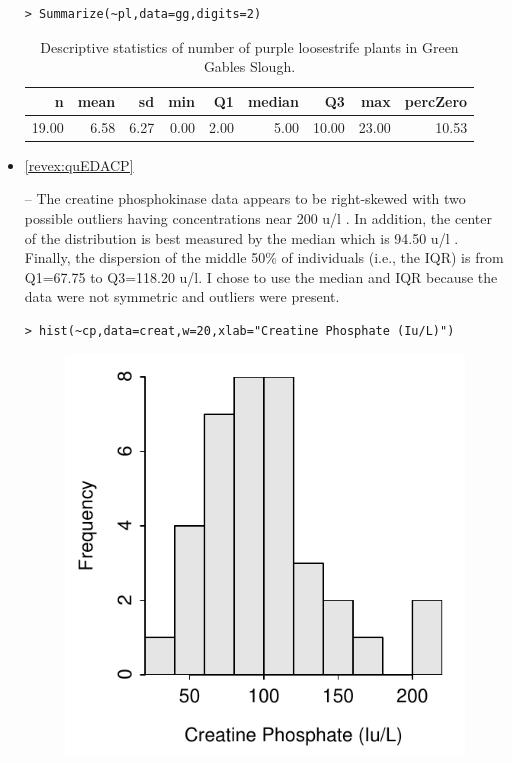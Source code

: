 \documentclass[10pt,openany]{book}\usepackage[]{graphicx}\usepackage[]{color}
\makeatletter
\newenvironment{kframe}{%
 \def\at@end@of@kframe{}%
 \ifinner\ifhmode%
  \def\at@end@of@kframe{\end{minipage}}%
  \begin{minipage}{\columnwidth}%
 \fi\fi%
 \def\FrameCommand##1{\hskip\@totalleftmargin \hskip-\fboxsep
 \colorbox{shadecolor}{##1}\hskip-\fboxsep
     \hskip-\linewidth \hskip-\@totalleftmargin \hskip\columnwidth}%
 \MakeFramed {\advance\hsize-\width
   \@totalleftmargin\z@ \linewidth\hsize
   \@setminipage}}%
 {\par\unskip\endMakeFramed%
 \at@end@of@kframe}
\newenvironment{knitrout}{}{} %
\makeatother
\begin{document}
\begin{itemize}
\begin{knitrout}
\end{knitrout}
\begin{knitrout}
\color{fgcolor}\begin{kframe}
\begin{verbatim}
> Summarize(~pl,data=gg,digits=2)
\end{verbatim}
\end{kframe}
\end{knitrout}
\begin{table}[ht]
\centering
\caption{Descriptive statistics of number of purple loosestrife plants in Green Gables Slough.} 
\label{tab:PLSum}
\begin{tabular}{rrrrrrrrr}
  \hline
n & mean & sd & min & Q1 & median & Q3 & max & percZero \\ 
  \hline
19.00 & 6.58 & 6.27 & 0.00 & 2.00 & 5.00 & 10.00 & 23.00 & 10.53 \\ 
   \hline
\end{tabular}
\end{table}


  \item \hypertarget{ans:quEDACP}{\ref{revex:quEDACP}} --   The creatine phosphokinase data appears to be right-skewed with two possible outliers having concentrations near 200 u/l .  In addition, the center of the distribution is best measured by the median which is 94.50 u/l .  Finally, the dispersion of the middle 50\% of individuals (i.e., the IQR) is from Q1=67.75 to Q3=118.20 u/l.  I chose to use the median and IQR because the data were not symmetric and outliers were present.
\begin{knitrout}
\color{fgcolor}\begin{kframe}
\begin{verbatim}
> hist(~cp,data=creat,w=20,xlab="Creatine Phosphate (Iu/L)")
\end{verbatim}
\end{kframe}\begin{figure}[hbtp]

{\centering \includegraphics[width=.4\linewidth]{Figs/CPHist-1} 

}
\end{figure}
\end{knitrout}
\end{itemize}
\end{document}

